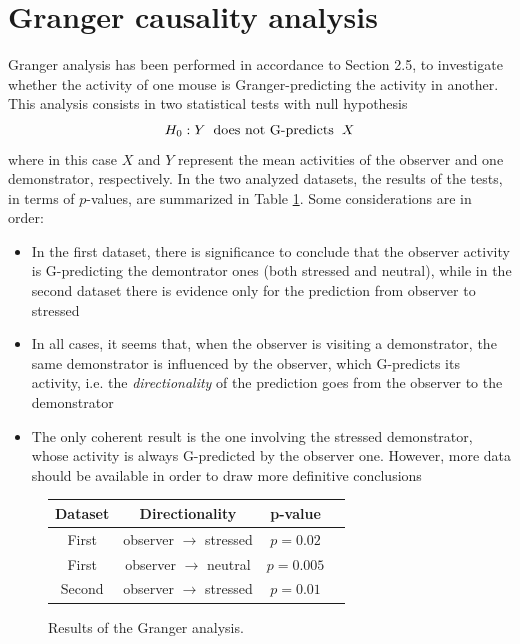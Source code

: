 \documentclass[12pt, a4paper]{report}
\begin{document}
\section{Granger causality analysis}

Granger analysis has been performed in accordance to Section 2.5, to investigate whether the activity of one mouse is Granger-predicting the activity in another. This analysis consists in two statistical tests with null hypothesis
$$ H_0:  Y \hspace{0.2cm} \text{does not G-predicts} \hspace{0.2 cm} X $$
where in this case $X$ and $Y$ represent the mean activities of the observer and one demonstrator, respectively. In the two analyzed datasets, the results of the tests, in terms of $p$-values, are summarized in Table \ref{Granger table}. Some considerations are in order:

\begin{itemize}
	\item In the first dataset, there is significance to conclude that the observer activity is G-predicting the demontrator ones (both stressed and neutral), while in the second dataset there is evidence only for the prediction from observer to stressed
	
	\item In all cases, it seems that,  when the observer is visiting a demonstrator, the same demonstrator is influenced by the observer, which G-predicts its activity, i.e. the \textit{directionality} of the prediction goes from the observer to the demonstrator
	
	\item The only coherent result is the one involving the stressed demonstrator, whose activity is always G-predicted by the observer one. However, more data should be available in order to draw more definitive conclusions
\end{itemize}



\begin{figure}[H]
	\begin{center}
		\begin{tabular}{ |c|c|c|c| } 
			\hline
			\textbf{Dataset} & \textbf{Directionality} & \textbf{p-value} \\
			\hline
			First & observer $\rightarrow$ stressed & $p = 0.02$ \\ 
			\hline
			First & observer $\rightarrow$ neutral & $p = 0.005$ \\
			\hline
			Second & observer $\rightarrow$ stressed & $p  =  0.01$ \\
			
			\hline
		\end{tabular}
		
	\end{center}
	\caption{Results of the Granger analysis.} \label{Granger table}
\end{figure}
\end{document}

